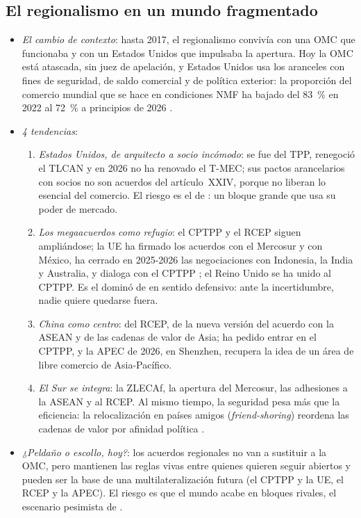 \documentclass[11pt]{article}
\begin{document}
\subsection{El regionalismo en un mundo fragmentado}\label{sec:fragmentacion}

\begin{itemize}
\item \emph{El cambio de contexto}: hasta 2017, el regionalismo convivía con una OMC que funcionaba y con un Estados Unidos que impulsaba la apertura. Hoy la OMC está atascada, sin juez de apelación, y Estados Unidos usa los aranceles con fines de seguridad, de saldo comercial y de política exterior: la proporción del comercio mundial que se hace en condiciones NMF ha bajado del 83~\% en 2022 al 72~\% a principios de 2026\nocite{OMC2026Perspectivas}  .
\item \emph{4 tendencias}:
  \begin{enumerate}
  \item \emph{Estados Unidos, de arquitecto a socio incómodo}: se fue del TPP, renegoció el TLCAN y en 2026 no ha renovado el T-MEC; sus pactos arancelarios con socios no son acuerdos del artículo~XXIV, porque no liberan lo esencial del comercio. El riesgo es el de : un bloque grande que usa su poder de mercado.
  \item \emph{Los megaacuerdos como refugio}: el CPTPP y el RCEP siguen ampliándose; la UE ha firmado los acuerdos con el Mercosur y con México, ha cerrado en 2025-2026 las negociaciones con Indonesia, la India y Australia, y dialoga con el CPTPP ; el Reino Unido se ha unido al CPTPP. Es el dominó de  en sentido defensivo: ante la incertidumbre, nadie quiere quedarse fuera.
  \item \emph{China como centro}: del RCEP, de la nueva versión del acuerdo con la ASEAN y de las cadenas de valor de Asia; ha pedido entrar en el CPTPP, y la APEC de 2026, en Shenzhen, recupera la idea de un área de libre comercio de Asia-Pacífico.
  \item \emph{El Sur se integra}: la ZLECAf, la apertura del Mercosur, las adhesiones a la ASEAN y al RCEP. Al mismo tiempo, la seguridad pesa más que la eficiencia: la relocalización en países amigos (\emph{friend-shoring}) reordena las cadenas de valor por afinidad política  .
  \end{enumerate}
\item \emph{¿Peldaño o escollo, hoy?}: los acuerdos regionales no van a sustituir a la OMC, pero mantienen las reglas vivas entre quienes quieren seguir abiertos y pueden ser la base de una multilateralización futura (el CPTPP y la UE, el RCEP y la APEC). El riesgo es que el mundo acabe en bloques rivales, el escenario pesimista de .
\end{itemize}
\end{document}
